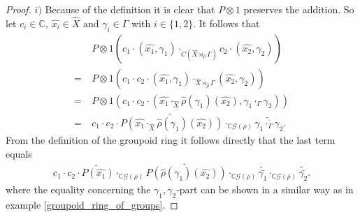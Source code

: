 \documentclass[12pt,a4paper]{scrartcl}
\theoremstyle{plain}
\theoremstyle{definition}
\numberwithin{equation}{section}
\newcommand{\C}{\mathbb{C}} %
\newcommand{\2}{\mathbb{Z} / 2 \mathbb{Z}}
\newcommand{\G}{\mathcal{G}}
\newcommand{\1}{\bar{1}}
\newcommand{\0}{\bar{0}}
\begin{document}
\begin{proof}
	$i)$ Because of the definition it is clear that $P \otimes 1$ preserves the addition. So let $c_i \in \C$, $\hat{x_i} \in \hat{X}$ and $\gamma_i \in \Gamma$ with $i \in \{1,2\}$. It follows that
	\begin{align*}
		 &~ P \otimes 1(c_1 \cdot (\hat{x_1}, \gamma_1) \cdot_{C(\hat{X} \rtimes_{\hat{\rho}} \Gamma)} c_2 \cdot (\hat{x_2}, \gamma_2))  \\
		=&~ P \otimes 1(c_1 \cdot  c_2 \cdot (\hat{x_1}, \gamma_1) \cdot_{\hat{X} \rtimes_{\hat{\rho}} \Gamma} (\hat{x_2}, \gamma_2)) \\
		=&~ P \otimes 1(c_1 \cdot  c_2 \cdot (\hat{x_1} \cdot_{\hat{X}} \hat{\rho}(\gamma_1)(\hat{x_2}), \gamma_1 \cdot_{\Gamma} \gamma_2)) \\
		=&~ c_1 \cdot  c_2 \cdot \widetilde{P(\hat{x_1} \cdot_{\hat{X}} \hat{\rho}(\gamma_1)(\hat{x_2}))} \cdot_{\C\G(\rho)} \widetilde{\overline{\gamma_1 \cdot_{\Gamma} \gamma_2}}.
	\end{align*}
	From the definition of the groupoid ring it follows directly that the last term equals 
	\begin{align*}
		c_1 \cdot  c_2 \cdot \widetilde{P(\hat{x_1})} \cdot_{\C\G(\rho)} \widetilde{P(\hat{\rho}(\gamma_1)(\hat{x_2}))} \cdot_{\C\G(\rho)} \widetilde{\bar{\gamma_1}} \cdot_{\C\G(\rho)} \widetilde{\bar{\gamma_2}}.
	\end{align*}
	where the equality concerning the $\gamma_1, \gamma_2$-part can be shown in a similar way as in example \ref{groupoid_ring_of_groups}.
	

\end{proof}
\end{document}
